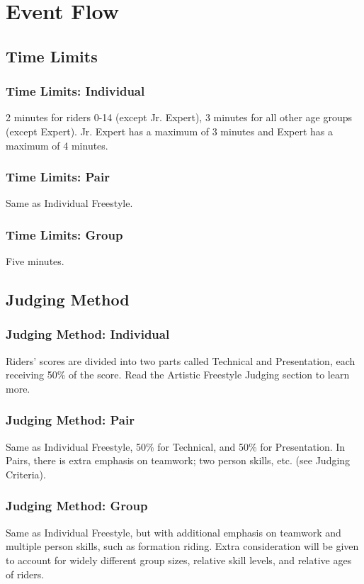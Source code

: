\section{Event Flow}

\subsection{Time Limits}

\subsubsection{Time Limits: Individual}
2 minutes for riders 0-14 (except Jr. Expert), 3 minutes for all other age groups (except Expert).
Jr. Expert has a maximum of 3 minutes and Expert has a maximum of 4 minutes.

\subsubsection{Time Limits: Pair}
Same as Individual Freestyle.

\subsubsection{Time Limits: Group}
Five minutes.

\subsection{Judging Method}

\subsubsection{Judging Method: Individual}
Riders' scores are divided into two parts called Technical and Presentation, each receiving 50\% of the score.
Read the Artistic Freestyle Judging section to learn more.

\subsubsection{Judging Method: Pair}
Same as Individual Freestyle, 50\% for Technical, and 50\% for Presentation.
In Pairs, there is extra emphasis on teamwork; two person skills, etc.
(see Judging Criteria).

\subsubsection{Judging Method: Group}
Same as Individual Freestyle, but with additional emphasis on teamwork and multiple person skills, such as formation riding.
Extra consideration will be given to account for widely different group sizes, relative skill levels, and relative ages of riders.


